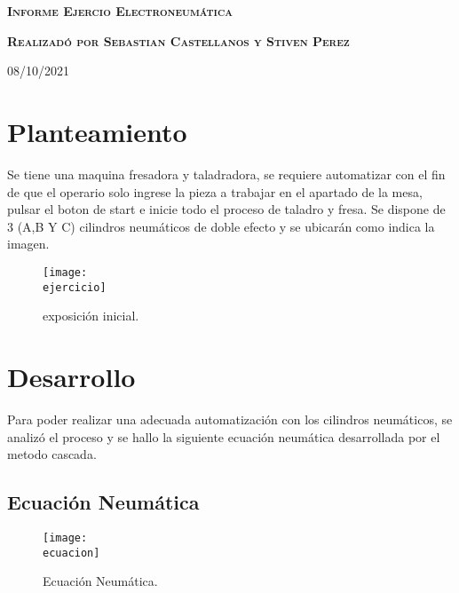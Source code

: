 \documentclass[a4paper]{article}
\newcommand{\startDate}{08/10/2021}
\newcommand{\ejercicio}{images/ejercicio.png}
\newcommand{\ecuacion}{images/ecuacionNeumatica.jpg}
\begin{document}
  \cfoot{\thepage}
\begin{titlepage}
  \centering
  {\scshape\LARGE \textbf{Informe Ejercio Electroneumática}\par{}}
  {\scshape{}\LARGE{}\textbf{Realizadó por Sebastian Castellanos y Stiven Perez}\par{}}
  \vspace{0.2cm}
  \vfill{}
  \vfill{}\vfill{}
  \vfill{}
  \vfill{}
  {\large\startDate}
\end{titlepage}
\clearpage{}
\tableofcontents{}
\clearpage{}
\section{Planteamiento}
Se tiene una maquina fresadora y taladradora, se requiere automatizar con el fin de que el operario solo ingrese la pieza a trabajar en el apartado de la mesa, pulsar el boton de start e inicie todo el proceso de taladro y fresa. Se dispone de 3 (A,B Y C) cilindros neumáticos de doble efecto y se ubicarán como indica la imagen.
\vspace{0.2cm}
\begin{figure}[h]
  \centering{}
  \texttt{[image: \\ejercicio]}
  \caption{exposición inicial.}
\end{figure}
\vspace{0.2cm}
\vspace{0.2cm}
\section{Desarrollo}
Para poder realizar una adecuada automatización con los cilindros neumáticos, se analizó el proceso y se hallo la siguiente ecuación neumática desarrollada por el metodo cascada.
\subsection{Ecuación Neumática}
\vspace{0.2cm}
\begin{figure}[h]
  \centering{}
  \texttt{[image: \\ecuacion]}
  \caption{Ecuación Neumática.}
\end{figure}
\end{document}
